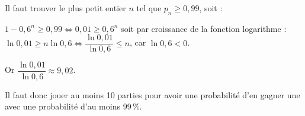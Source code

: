 \begin{enumerate}
\begin{enumerate}
Il faut trouver le plus petit entier $n$ tel que $p_n \geqslant 0,99$, soit :
		
$1 - 0,6^n \geqslant 0,99 \iff 0,01 \geqslant 0,6^n$ soit par croissance de la fonction logarithme : $\ln 0,01 \geqslant n \ln 0,6 \iff \dfrac{\ln 0,01}{\ln 0,6} \leqslant n$, car $\ln 0,6 < 0$.
		
Or $\dfrac{\ln 0,01}{\ln 0,6} \approx 9,02$.
		
Il faut donc jouer au moins 10 parties pour avoir une probabilité d'en gagner une avec une probabilité d'au moins 99\,\%.
	\end{enumerate}
\end{enumerate}

\bigskip

